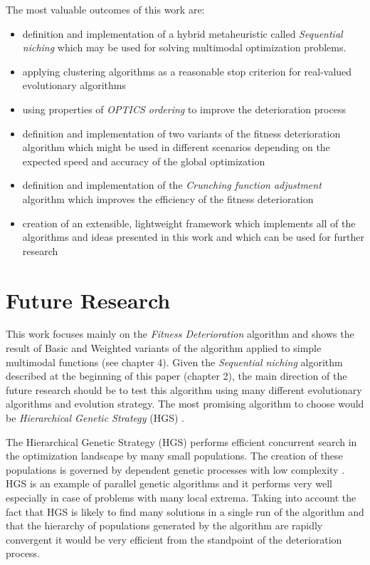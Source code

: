 The most valuable outcomes of this work are:
\begin{itemize}
  \item definition and implementation of a hybrid metaheuristic called \textit{Sequential
  niching} which may be used for solving multimodal optimization problems.
  \item applying clustering algorithms as a reasonable stop criterion for
  real-valued evolutionary algorithms
  \item using properties of \textit{OPTICS ordering} \cite{optics} to improve
  the deterioration process
  \item definition and implementation of two variants of the fitness
  deterioration algorithm which might be used in different scenarios depending
  on the expected speed and accuracy of the global optimization
  \item definition and implementation of the \textit{Crunching function
  adjustment} algorithm which improves the efficiency of the fitness
  deterioration
  \item creation of an extensible, lightweight framework which implements all of
  the algorithms and ideas presented in this work and which can be used for
  further research
\end{itemize}


\section{Future Research}

This work focuses mainly on the \textit{Fitness Deterioration} algorithm and
shows the result of Basic and Weighted variants of the algorithm applied to
simple multimodal functions (see chapter 4). Given the \textit{Sequential
niching} algorithm described at the beginning of this paper (chapter 2), the main
direction of the future research should be to test this algorithm using many 
different evolutionary algorithms and evolution strategy.
The most promising algorithm to choose would be \textit{Hierarchical Genetic
Strategy} (HGS) \cite{hgs}.

The Hierarchical Genetic Strategy (HGS) performs efficient concurrent
search in the optimization landscape by many small populations. The creation of
these populations is governed by dependent genetic processes with low complexity
\cite{hgs}. HGS is an example of parallel genetic algorithms and it performs
very well especially in case of problems with many local extrema.
Taking into account the fact that HGS is likely to find many solutions in a
single run of the algorithm and that the hierarchy of populations generated
by the algorithm are rapidly convergent it would be very efficient 
from the standpoint of the deterioration process.

